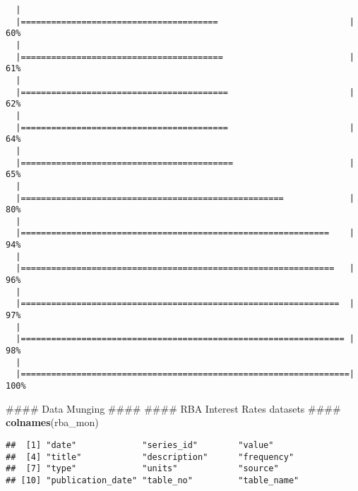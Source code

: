 \documentclass[]{article}
\newenvironment{Shaded}{\begin{snugshade}}{\end{snugshade}}
\newcommand{\KeywordTok}[1]{\textcolor[rgb]{0.13,0.29,0.53}{\textbf{#1}}}
\newcommand{\OperatorTok}[1]{\textcolor[rgb]{0.81,0.36,0.00}{\textbf{#1}}}
\newcommand{\NormalTok}[1]{#1}
\begin{document}
\begin{verbatim}
  |                                                                       
  |=======================================                          |  60%
  |                                                                       
  |========================================                         |  61%
  |                                                                       
  |=========================================                        |  62%
  |                                                                       
  |=========================================                        |  64%
  |                                                                       
  |==========================================                       |  65%
  |                                                                       
  |====================================================             |  80%
  |                                                                       
  |=============================================================    |  94%
  |                                                                       
  |==============================================================   |  96%
  |                                                                       
  |===============================================================  |  97%
  |                                                                       
  |================================================================ |  98%
  |                                                                       
  |=================================================================| 100%
\end{verbatim}

\begin{Shaded}
\begin{Highlighting}[]
\NormalTok{  #### Data Munging ####}
\NormalTok{    #### RBA Interest Rates datasets ####}
    \KeywordTok{colnames}\NormalTok{(rba_mon)}
\end{Highlighting}
\end{Shaded}

\begin{verbatim}
##  [1] "date"             "series_id"        "value"           
##  [4] "title"            "description"      "frequency"       
##  [7] "type"             "units"            "source"          
## [10] "publication_date" "table_no"         "table_name"
\end{verbatim}

\begin{Shaded}
\end{Shaded}
\end{document}
